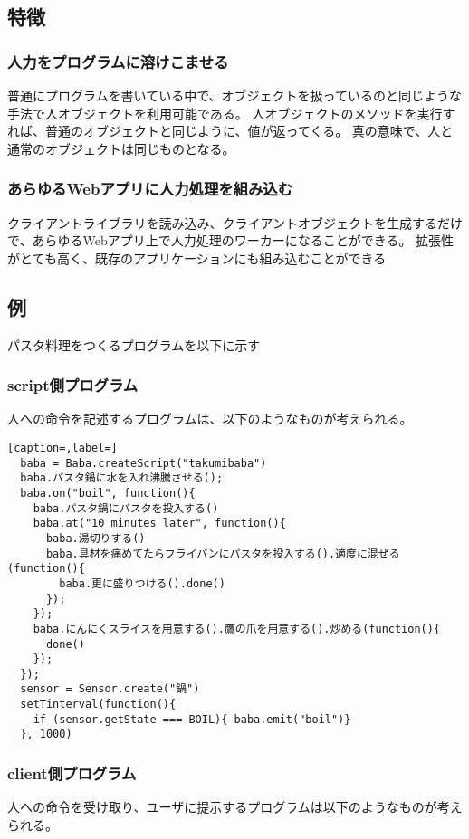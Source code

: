 \documentclass{deimj}
\begin{document}
\subsection{特徴}
\subsubsection{人力をプログラムに溶けこませる}
普通にプログラムを書いている中で、オブジェクトを扱っているのと同じような手法で人オブジェクトを利用可能である。
人オブジェクトのメソッドを実行すれば、普通のオブジェクトと同じように、値が返ってくる。
真の意味で、人と通常のオブジェクトは同じものとなる。

\subsubsection{あらゆるWebアプリに人力処理を組み込む}
クライアントライブラリを読み込み、クライアントオブジェクトを生成するだけで、あらゆるWebアプリ上で人力処理のワーカーになることができる。
拡張性がとても高く、既存のアプリケーションにも組み込むことができる

\subsection{例}
パスタ料理をつくるプログラムを以下に示す

\subsubsection{script側プログラム}
人への命令を記述するプログラムは、以下のようなものが考えられる。

  
\begin{lstlisting}[caption=,label=]
  baba = Baba.createScript("takumibaba")
  baba.パスタ鍋に水を入れ沸騰させる();
  baba.on("boil", function(){
    baba.パスタ鍋にパスタを投入する()
    baba.at("10 minutes later", function(){
      baba.湯切りする()
      baba.具材を痛めてたらフライパンにパスタを投入する().適度に混ぜる(function(){
        baba.更に盛りつける().done()
      });
    });
    baba.にんにくスライスを用意する().鷹の爪を用意する().炒める(function(){
      done()
    });   
  });
  sensor = Sensor.create("鍋")
  setTinterval(function(){
    if (sensor.getState === BOIL){ baba.emit("boil")}
  }, 1000)
\end{lstlisting}
  

\subsubsection{client側プログラム}
人への命令を受け取り、ユーザに提示するプログラムは以下のようなものが考えられる。
\end{document}
